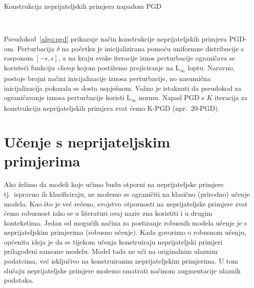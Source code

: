 \documentclass[times, utf8, zavrsni, numeric]{fer}
\begin{document}
\begin{algorithm}
    \caption{Konstrukcija neprijateljskih primjera napadom PGD}
    \label{algo:pgd}
    \begin{algorithmic}
        \\\hrulefill
        \ENDFOR
    \end{algorithmic}
\end{algorithm}

\pagebreak

Pseudokod~\ref{algo:pgd} prikazuje način konstrukcije neprijateljskih primjera PGD-om. 
Perturbacija $\delta$ na početku je inicijalizirana pomoću uniformne distribucije s rasponom $[-\epsilon, \epsilon]$, 
a na kraju svake iteracije iznos perturbacije ograničava se koristeći funkciju \textit{clamp} kojom postižemo projiciranje na L\textsubscript{$\infty$} loptu. 
Naravno, postoje brojni načini inicijalizacije iznosa perturbacije, no nasumična inicijalizacija pokazala se dosta uspješnom.
Važno je istaknuti da pseudokod za ograničavanje iznosa perturbacije koristi L\textsubscript{$\infty$} normu. 
Napad PGD s $K$ iteracija za konstrukciju neprijateljskih primjera zvat ćemo K-PGD (npr.\ 20-PGD).

\section{Učenje s neprijateljskim primjerima}

Ako želimo da modeli koje učimo budu otporni na neprijateljske primjere tj.\ ispravno ih klasificiraju, ne možemo se ograničiti na klasično (prirodno) učenje modela.
Kao što je već rečeno, svojstvo otpornosti na neprijateljske primjere zvat ćemo robusnost iako se u literaturi ovaj naziv zna koristiti i u drugim kontekstima.
Jedan od mogućih načina za postizanje robusnih modela učenje je s neprijateljskim primjerima (robusno učenje).
Kada govorimo o robusnom učenju, općenita ideja je da se tijekom učenja konstruiraju neprijateljski primjeri prilagođeni samome modelu.
Model tada ne uči na originalnim ulaznim podatcima, već isključivo na konstruiranim neprijateljskim primjerima.
U tom slučaju neprijateljske primjere možemo smatrati načinom augmentacije ulaznih podataka. %
\end{document}
